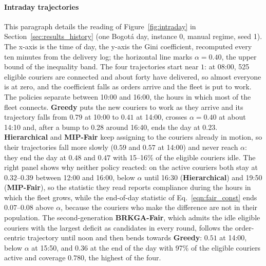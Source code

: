 \documentclass[a4paper,11pt,review,3p,authoryear]{elsarticle}
\begin{document}
\paragraph{Intraday trajectories} This paragraph details the reading of Figure~\ref{fig:intraday} in Section~\ref{sec:results_history} (one Bogot\'a day, instance 0, manual regime, seed 1). The x-axis is the time of day, the y-axis the Gini coefficient, recomputed every ten minutes from the delivery log; the horizontal line marks $\alpha = 0.40$, the upper bound of the inequality band. The four trajectories start near $1$: at 08:00, 525 eligible couriers are connected and about forty have delivered, so almost everyone is at zero, and the coefficient falls as orders arrive and the fleet is put to work. The policies separate between 10:00 and 16:00, the hours in which most of the fleet connects. \textbf{Greedy} puts the new couriers to work as they arrive and its trajectory falls from $0.79$ at 10:00 to $0.41$ at 14:00, crosses $\alpha = 0.40$ at about 14:10 and, after a bump to $0.28$ around 16:40, ends the day at $0.23$. \textbf{Hierarchical} and \textbf{MIP-Fair} keep assigning to the couriers already in motion, so their trajectories fall more slowly ($0.59$ and $0.57$ at 14:00) and never reach $\alpha$: they end the day at $0.48$ and $0.47$ with 15--16\% of the eligible couriers idle. The right panel shows why neither policy reacted: on the active couriers both stay at $0.32$--$0.39$ between 12:00 and 16:00, below $\alpha$ until 16:30 (\textbf{Hierarchical}) and 19:50 (\textbf{MIP-Fair}), so the statistic they read reports compliance during the hours in which the fleet grows, while the end-of-day statistic of Eq.~\eqref{eqn:fair_const} ends $0.07$--$0.08$ above $\alpha$, because the couriers who make the difference are not in their population. The second-generation \textbf{BRKGA-Fair}, which admits the idle eligible couriers with the largest deficit as candidates in every round, follows the order-centric trajectory until noon and then bends towards \textbf{Greedy}: $0.51$ at 14:00, below $\alpha$ at 15:50, and $0.36$ at the end of the day with 97\% of the eligible couriers active and coverage $0.780$, the highest of the four.
\end{document}
